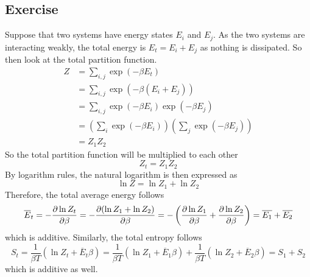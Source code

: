 \subsection{Exercise}
Suppose that two systems have energy states $E_i$ and $E_j$. As the two systems are interacting weakly, the total energy is $E_t = E_i + E_j$ as nothing is dissipated. So then look at the total partition function. 
\begin{align}
    Z &= \sum_{i, j}\exp (-\beta E_t)\\
    &= \sum_{i, j}\exp (-\beta (E_i + E_j))\\
    &= \sum_{i, j}\exp(-\beta E_i) \exp(-\beta E_j) \\
    &= \left(\sum_i \exp(-\beta E_i)\right) \left(\sum_j \exp(-\beta E_j)\right) \\
    &= Z_1 Z_2
\end{align}
So the total partition function will be multiplied to each other 
\begin{equation}
    Z_t = Z_1 Z_2
\end{equation}
By logarithm rules, the natural logarithm is then expressed as
\begin{equation}
    \ln Z = \ln Z_1 + \ln Z_2
\end{equation}
Therefore, the total average energy follows 
\begin{equation}\overline E_t = -\pdv{\ln Z_t}{\beta} = -\pdv{(\ln Z_1 + \ln Z_2)}{\beta} = -\left(\pdv{\ln Z_1}{\beta} + \pdv{\ln Z_2}{\beta}\right) = \overline{E_1} + \overline{E_2}
\end{equation}
which is additive. Similarly, the total entropy follows 
\begin{equation}
    S_t = \frac{1}{\beta T}(\ln Z_t + \overline E_t \beta) = \frac{1}{\beta T}(\ln Z_1 + \overline E_1 \beta) + \frac{1}{\beta T}(\ln Z_2 + \overline E_2 \beta) = S_1 + S_2
\end{equation}
which is additive as well.
\newpage 